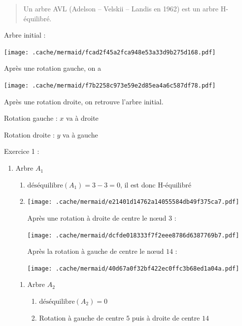 \begin{quote}
Un arbre AVL (Adelson -- Velskii -- Landis en 1962) est un arbre
H-équilibré.
\end{quote}

Arbre initial :

\texttt{[image: .cache/mermaid/fcad2f45a2fca948e53a33d9b275d168.pdf]}

Après une rotation gauche, on a

\texttt{[image: .cache/mermaid/f7b2258c973e59e2d85ea4a6c587df78.pdf]}

Après une rotation droite, on retrouve l'arbre initial.

Rotation gauche : \(x\) va à droite

Rotation droite : \(y\) va à gauche

Exercice 1 :

\begin{enumerate}
\def\labelenumi{\arabic{enumi}.}
\tightlist
\item
  Arbre \(A_1\)

  \begin{enumerate}
  \def\labelenumii{\alph{enumii}.}
  \item
    \(\mathrm{déséquilibre}(A_1) = 3 - 3 = 0\), il est donc H-équilibré
  \item
    \texttt{[image: .cache/mermaid/e21401d14762a14055584db49f375ca7.pdf]}

    Après une rotation à droite de centre le nœud \(3\) :

    \texttt{[image: .cache/mermaid/dcfde018333f7f2eee8786d6387769b7.pdf]}

    Après la rotation à gauche de centre le nœud \(14\) :

    \texttt{[image: .cache/mermaid/40d67a0f32bf422ec0ffc3b68ed1a04a.pdf]}
  \end{enumerate}

  \begin{enumerate}
  \def\labelenumii{\arabic{enumii}.}
  \setcounter{enumii}{1}
  \item
    Arbre \(A_2\)

    \begin{enumerate}
    \def\labelenumiii{\alph{enumiii}.}
    \tightlist
    \item
      \(\mathrm{déséquilibre}(A_2) = 0\)
    \item
      Rotation à gauche de centre \(5\) puis à droite de centre \(14\)
    \end{enumerate}
  \end{enumerate}
\end{enumerate}

